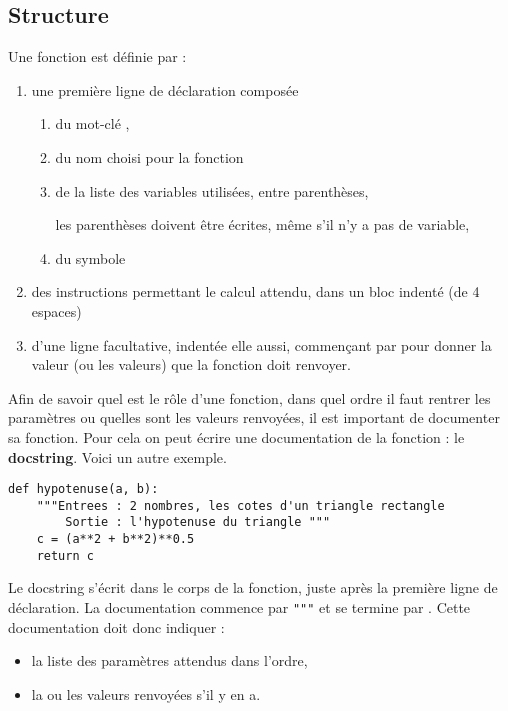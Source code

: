 \subsection{Structure}
Une fonction est définie par :
\begin{enumerate}
\item une première ligne de déclaration composée
\begin{enumerate}
    \item du mot-clé ,
    \item du nom choisi pour la fonction
    \item de la liste des variables utilisées, entre parenthèses,
    
    les parenthèses doivent être écrites, même s'il n'y a pas de variable,
    \item du symbole \Type{:}
\end{enumerate}
\item des instructions permettant le calcul attendu, dans un bloc indenté (de 4 espaces)
\item d'une ligne facultative, indentée elle aussi, commençant par  pour donner la valeur (ou les valeurs) que la fonction doit renvoyer.
\end{enumerate}
  
\medskip

Afin de savoir quel est le rôle d'une fonction, dans quel ordre il faut rentrer les paramètres ou quelles sont les valeurs renvoyées, il est important de documenter sa fonction. Pour cela on peut écrire une documentation de la fonction : le {\bf docstring}. Voici un autre exemple.
\begin{lstlisting}
def hypotenuse(a, b):
    """Entrees : 2 nombres, les cotes d'un triangle rectangle
        Sortie : l'hypotenuse du triangle """
	c = (a**2 + b**2)**0.5
	return c
\end{lstlisting}
Le docstring s'écrit dans le corps de la fonction, juste après la première ligne de déclaration. La documentation commence par \texttt{"""} et se termine par .
Cette documentation doit donc indiquer :
\begin{itemize}
	\item la liste des paramètres attendus dans l'ordre, 
	\item la ou les valeurs renvoyées s'il y en a.
\end{itemize}

